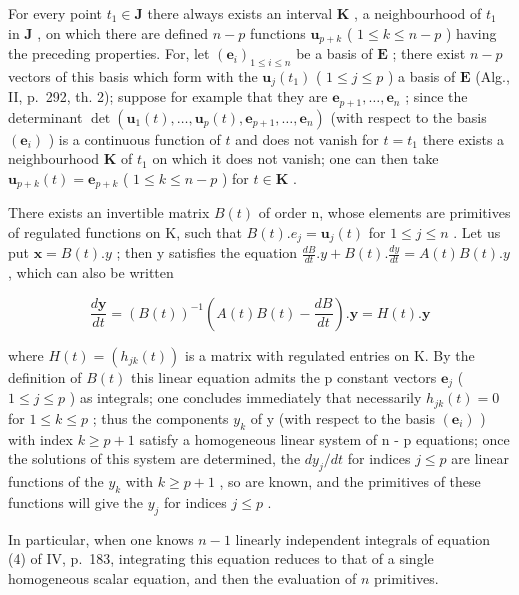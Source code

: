 For every point \(t_1 \in \mathbf{J}\) there always exists an interval \(\mathbf{K}\) , a neighbourhood of \(t_1\) in \(\mathbf{J}\) , on which there are defined \(n - p\) functions \(\mathbf{u}_{p+k}\) ( \(1 \leqslant k \leqslant n - p\) ) having the preceding properties. For, let \((\mathbf{e}_i)_{1 \leqslant i \leqslant n}\) be a basis of \(\mathbf{E}\) ; there exist \(n - p\) vectors of this basis which form with the \(\mathbf{u}_j(t_1)\) ( \(1 \leqslant j \leqslant p\) ) a basis of \(\mathbf{E}\) (Alg., II, p.~292, th. 2); suppose for example that they are \(\mathbf{e}_{p+1}, \ldots, \mathbf{e}_n\) ; since the determinant \(\det(\mathbf{u}_1(t), \ldots, \mathbf{u}_p(t), \mathbf{e}_{p+1}, \ldots, \mathbf{e}_n)\) (with respect to the basis \((\mathbf{e}_i)\) ) is a continuous function of \(t\) and does not vanish for \(t = t_1\) there exists a neighbourhood \(\mathbf{K}\) of \(t_1\) on which it does not vanish; one can then take \(\mathbf{u}_{p+k}(t) = \mathbf{e}_{p+k}\) ( \(1 \leqslant k \leqslant n - p\) ) for \(t \in \mathbf{K}\) .

There exists an invertible matrix \(B(t)\) of order n, whose elements are primitives of regulated functions on K, such that \(B(t).e_{j} = \mathbf{u}_{j}(t)\) for \(1 \leqslant j \leqslant n\) . Let us put \(\mathbf{x} = B(t).y\) ; then y satisfies the equation \(\frac{dB}{dt}.y + B(t).\frac{dy}{dt} = A(t)B(t).y\) , which can also be written

\[
\frac {d \mathbf {y}}{d t} = (B (t)) ^ {- 1} \left(A (t) B (t) - \frac {d B}{d t}\right). \mathbf {y} = H (t). \mathbf {y}
\]

where \(H(t) = \left(h_{jk}(t)\right)\) is a matrix with regulated entries on K. By the definition of \(B(t)\) this linear equation admits the p constant vectors \(\mathbf{e}_{j}\) ( \(1 \leqslant j \leqslant p\) ) as integrals; one concludes immediately that necessarily \(h_{jk}(t) = 0\) for \(1 \leqslant k \leqslant p\) ; thus the components \(y_{k}\) of y (with respect to the basis \((\mathbf{e}_{i})\) ) with index \(k \geqslant p + 1\) satisfy a homogeneous linear system of n - p equations; once the solutions of this system are determined, the \(dy_{j}/dt\) for indices \(j \leqslant p\) are linear functions of the \(y_{k}\) with \(k \geqslant p + 1\) , so are known, and the primitives of these functions will give the \(y_{j}\) for indices \(j \leqslant p\) .

In particular, when one knows \(n - 1\) linearly independent integrals of equation (4) of IV, p.~183, integrating this equation reduces to that of a single homogeneous scalar equation, and then the evaluation of \(n\) primitives.

